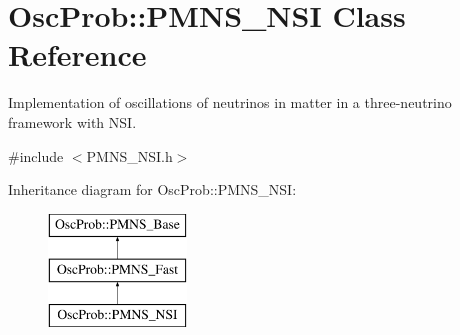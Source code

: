 \hypertarget{classOscProb_1_1PMNS__NSI}{}\section{Osc\+Prob\+:\+:P\+M\+N\+S\+\_\+\+N\+SI Class Reference}
\label{classOscProb_1_1PMNS__NSI}


Implementation of oscillations of neutrinos in matter in a three-\/neutrino framework with N\+SI.  




{\ttfamily \#include $<$P\+M\+N\+S\+\_\+\+N\+S\+I.\+h$>$}

Inheritance diagram for Osc\+Prob\+:\+:P\+M\+N\+S\+\_\+\+N\+SI\+:\begin{figure}[H]
\begin{center}
\leavevmode
\includegraphics[height=3.000000cm]{classOscProb_1_1PMNS__NSI}
\end{center}
\end{figure}
